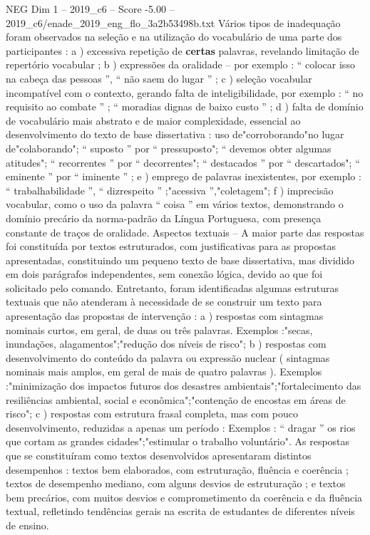 \begin{textsample}{NEG Dim 1 – 2019\_c6 – Score -5.00 – 2019\_c6/enade\_2019\_eng\_flo\_3a2b53498b.txt}
Vários tipos de inadequação foram observados na seleção e na utilização do vocabulário de uma parte dos participantes : a ) excessiva repetição de \textbf{certas} palavras, revelando limitação de repertório vocabular ; b ) expressões da oralidade – por exemplo : “ colocar isso na cabeça das pessoas ”, “ não saem do lugar ” ; c ) seleção vocabular incompatível com o contexto, gerando falta de inteligibilidade, por exemplo : “ no requisito ao combate ” ; “ moradias dignas de baixo custo ” ; d ) falta de domínio de vocabulário mais abstrato e de maior complexidade, essencial ao desenvolvimento do texto de base dissertativa : uso de"corroborando"no lugar de"colaborando"; “ suposto ” por “ pressuposto"; “ devemos obter algumas atitudes"; “ recorrentes ” por “ decorrentes"; “ destacados ” por “ descartados"; “ eminente ” por “ iminente ” ; e ) emprego de palavras inexistentes, por exemplo : “ trabalhabilidade ”, “ dizrespeito ” ;"acessiva ”,"coletagem"; f ) imprecisão vocabular, como o uso da palavra “ coisa ” em vários textos, demonstrando o domínio precário da norma-padrão da Língua Portuguesa, com presença constante de traços de oralidade.
Aspectos textuais – A maior parte das respostas foi constituída por textos estruturados, com justificativas para as propostas apresentadas, constituindo um pequeno texto de base dissertativa, mas dividido em dois parágrafos independentes, sem conexão lógica, devido ao que foi solicitado pelo comando.
Entretanto, foram identificadas algumas estruturas textuais que não atenderam à necessidade de se construir um texto para apresentação das propostas de intervenção : a ) respostas com sintagmas nominais curtos, em geral, de duas ou três palavras.
Exemplos :"secas, inundações, alagamentos";"redução dos níveis de risco"; b ) respostas com desenvolvimento do conteúdo da palavra ou expressão nuclear ( sintagmas nominais mais amplos, em geral de mais de quatro palavras ).
Exemplos :"minimização dos impactos futuros dos desastres ambientais";"fortalecimento das resiliências ambiental, social e econômica";"contenção de encostas em áreas de risco"; c ) respostas com estrutura frasal completa, mas com pouco desenvolvimento, reduzidas a apenas um período : Exemplos : “ dragar ” os rios que cortam as grandes cidades";"estimular o trabalho voluntário".
As respostas que se constituíram como textos desenvolvidos apresentaram distintos desempenhos : textos bem elaborados, com estruturação, fluência e coerência ; textos de desempenho mediano, com alguns desvios de estruturação ; e textos bem precários, com muitos desvios e comprometimento da coerência e da fluência textual, refletindo tendências gerais na escrita de estudantes de diferentes níveis de ensino.

\end{textsample}

